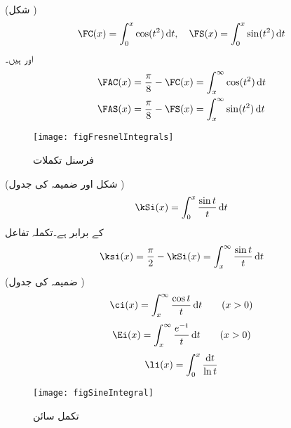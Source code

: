  (شکل )
\begin{align}
\FC(x)=\int_{0}^{x} \cos(t^2)\dif t,\quad \FS(x)=\int_{0}^{x}\sin(t^2)\dif t
\end{align}
 اور  ہیں۔
\begin{align}
\FAC(x)&=\frac{\pi}{8}-\FC(x)=\int_{x}^{\infty} \cos(t^2)\dif t\\
\FAS(x)&=\frac{\pi}{8}-\FS(x)=\int_{x}^{\infty} \sin(t^2)\dif t
\end{align}
%
\begin{figure}
\centering
\texttt{[image: figFresnelIntegrals]}
\caption{فرسنل تکملات}
\label{شکل_ضمیمہ_مفید_فرسنل_تکملات}
\end{figure}
 (شکل  اور ضمیمہ  کی جدول )
\begin{align}\label{مساوات_ضمیمہ_تفاعل_تکمل_سائن}
\kSi(x)=\int_{0}^{x}\frac{\sin t}{t} \dif t
\end{align}
 کے برابر ہے۔تکملہ تفاعل
\begin{align}
\ksi(x)=\frac{\pi}{2}-\kSi(x)=\int_{x}^{\infty} \frac{\sin t}{t}\dif t
\end{align}
 (ضمیمہ  کی جدول )
\begin{align}\label{مساوات_ضمیمہ_تفاعل_تکمل_کوسائن}
\ci(x)=\int_{x}^{\infty}\frac{\cos t}{t}\dif t \quad \quad (x>0)
\end{align}
\begin{align}
\Ei(x)=\int_{x}^{\infty} \frac{e^{-t}}{t}\dif t\quad \quad (x>0)
\end{align}
\begin{align}
\li(x)=\int_{0}^{x}\frac{\dif t}{\ln t}
\end{align}
%
\begin{figure}
\centering
\texttt{[image: figSineIntegral]}
\caption{تکمل سائن}
\label{شکل_ضمیمہ_مفید_تکمل_سائن}
\end{figure}
